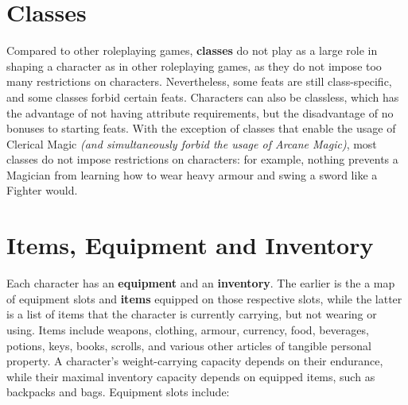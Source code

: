 \documentclass[openany,11pt,a4paper]{book}
\begin{document}
\section{Classes}
Compared to other roleplaying games, \textbf{classes} do not play as a large role in shaping a character as in other roleplaying games, as they do not impose too many restrictions on characters. Nevertheless, some feats are still class-specific, and some classes forbid certain feats. Characters can also be classless, which has the advantage of not having attribute requirements, but the disadvantage of no bonuses to starting feats.\newline
With the exception of classes that enable the usage of Clerical Magic \textit{(and simultaneously forbid the usage of Arcane Magic)}, most classes do not impose restrictions on characters: for example, nothing prevents a Magician from learning how to wear heavy armour and swing a sword like a Fighter would.\section{Items, Equipment and Inventory}
Each character has an \textbf{equipment} and an \textbf{inventory}. The earlier is the a map of equipment slots and \textbf{items} equipped on those respective slots, while the latter is a list of items that the character is currently carrying, but not wearing or using.\newline
Items include weapons, clothing, armour, currency, food, beverages, potions, keys, books, scrolls, and various other articles of tangible personal property. A character's weight-carrying capacity depends on their endurance, while their maximal inventory capacity depends on equipped items, such as backpacks and bags. Equipment slots include:
\end{document}
